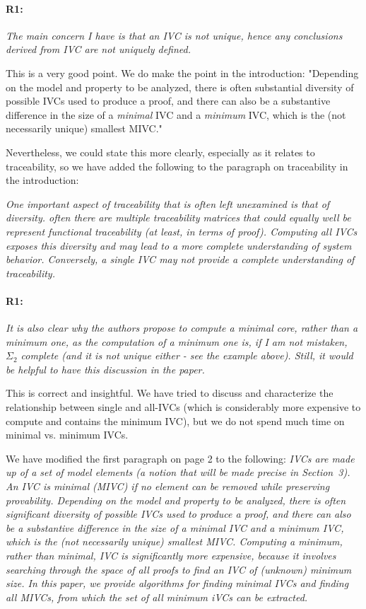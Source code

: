 \documentclass{article}
\begin{document}
\paragraph{R1:} \textit{The main concern I have is that an IVC is not unique, hence any conclusions derived from IVC are not uniquely defined.}

\vspace{0.05in}

\noindent This is a very good point.  We do make the point in the introduction: "Depending on the model and property to be analyzed, there is often substantial diversity of possible IVCs used to produce a proof, and there can also be a substantive difference in the size of a {\em minimal} IVC and a {\em minimum} IVC, which is the (not necessarily unique) smallest MIVC."

Nevertheless, we could state this more clearly, especially as it relates to traceability, so we have added the following to the paragraph on traceability in the introduction:

\textit{One important aspect of traceability that is often left unexamined is that of diversity. often there are multiple traceability matrices that could equally well be represent functional traceability (at least, in terms of proof).  Computing all IVCs exposes this diversity and may lead to a more complete understanding of system behavior.  Conversely, a single IVC may not provide a complete understanding of traceability.}

\paragraph{R1:} \textit{It is also clear why the authors propose to compute a minimal core, rather than a minimum one, as the computation of a minimum one is, if I am not mistaken, $\Sigma_2$ complete (and it is not unique either - see the example above). Still, it would be helpful to have this discussion in the paper.}
\vspace{0.05in}

\noindent This is correct and insightful.  We have tried to discuss and characterize the relationship between single and all-IVCs (which is considerably more expensive to compute and contains the minimum IVC), but we do not spend much time on minimal vs. minimum IVCs.

We have modified the first paragraph on page 2 to the following: 
\textit{IVCs are made up of a set of model elements (a notion that will be made precise in Section~3).  An IVC is {\em minimal} (MIVC) if no element can be removed while preserving provability.  Depending on the model and property to be analyzed, there is often significant diversity of possible IVCs used to produce a proof, and there can also be a substantive difference in the size of a {\em minimal} IVC and a {\em minimum} IVC, which is the (not necessarily unique) smallest MIVC.  Computing a minimum, rather than minimal, IVC is significantly more expensive, because it involves searching through the space of all proofs to find an IVC of (unknown) minimum size.  In this paper, we provide algorithms for finding minimal IVCs and finding {\em all} MIVCs, from which the set of all minimum iVCs can be extracted.}
\end{document}
